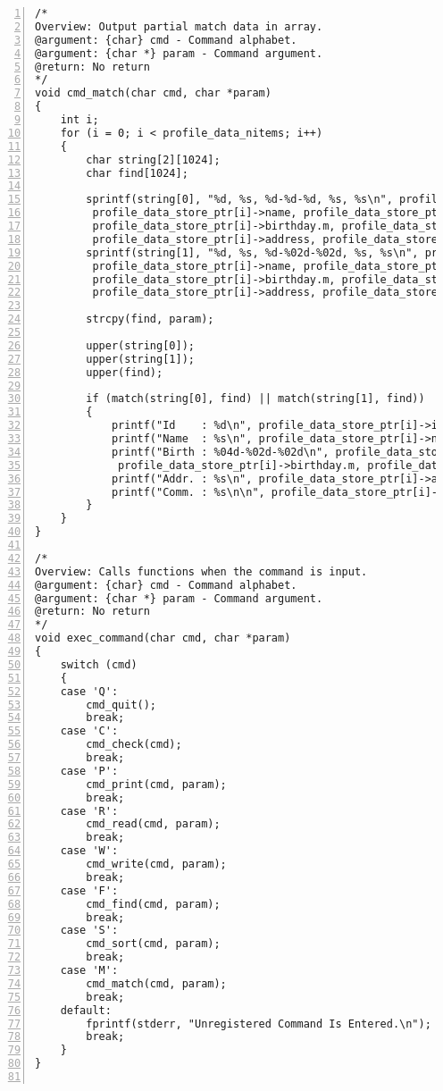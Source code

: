 \documentclass[autodetect-engine,dvi=dvipdfmx,ja=standard,
               a4j,11pt]{bxjsarticle}
\begin{document}
\begin{Verbatim}[numbers=left, xleftmargin=10mm, numbersep=6pt,
    fontsize=\small, baselinestretch=0.8]
/*
Overview: Output partial match data in array.
@argument: {char} cmd - Command alphabet.
@argument: {char *} param - Command argument.
@return: No return
*/
void cmd_match(char cmd, char *param)
{
    int i;
    for (i = 0; i < profile_data_nitems; i++)
    {
        char string[2][1024];
        char find[1024];

        sprintf(string[0], "%d, %s, %d-%d-%d, %s, %s\n", profile_data_store_ptr[i]->id,
         profile_data_store_ptr[i]->name, profile_data_store_ptr[i]->birthday.y,
         profile_data_store_ptr[i]->birthday.m, profile_data_store_ptr[i]->birthday.d,
         profile_data_store_ptr[i]->address, profile_data_store_ptr[i]->note);
        sprintf(string[1], "%d, %s, %d-%02d-%02d, %s, %s\n", profile_data_store_ptr[i]->id,
         profile_data_store_ptr[i]->name, profile_data_store_ptr[i]->birthday.y,
         profile_data_store_ptr[i]->birthday.m, profile_data_store_ptr[i]->birthday.d,
         profile_data_store_ptr[i]->address, profile_data_store_ptr[i]->note);

        strcpy(find, param);

        upper(string[0]);
        upper(string[1]);
        upper(find);

        if (match(string[0], find) || match(string[1], find))
        {
            printf("Id    : %d\n", profile_data_store_ptr[i]->id);
            printf("Name  : %s\n", profile_data_store_ptr[i]->name);
            printf("Birth : %04d-%02d-%02d\n", profile_data_store_ptr[i]->birthday.y,
             profile_data_store_ptr[i]->birthday.m, profile_data_store_ptr[i]->birthday.d);
            printf("Addr. : %s\n", profile_data_store_ptr[i]->address);
            printf("Comm. : %s\n\n", profile_data_store_ptr[i]->note);
        }
    }
}

/*
Overview: Calls functions when the command is input.
@argument: {char} cmd - Command alphabet.
@argument: {char *} param - Command argument.
@return: No return
*/
void exec_command(char cmd, char *param)
{
    switch (cmd)
    {
    case 'Q':
        cmd_quit();
        break;
    case 'C':
        cmd_check(cmd);
        break;
    case 'P':
        cmd_print(cmd, param);
        break;
    case 'R':
        cmd_read(cmd, param);
        break;
    case 'W':
        cmd_write(cmd, param);
        break;
    case 'F':
        cmd_find(cmd, param);
        break;
    case 'S':
        cmd_sort(cmd, param);
        break;
    case 'M':
        cmd_match(cmd, param);
        break;
    default:
        fprintf(stderr, "Unregistered Command Is Entered.\n");
        break;
    }
}


\end{Verbatim}
\end{document}
